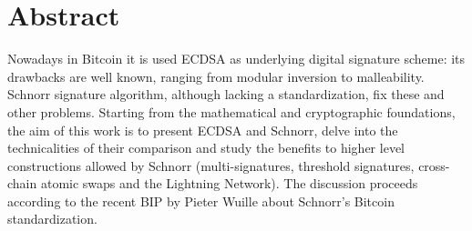\chapter{Abstract}
\label{chpr:abstract}
Nowadays in Bitcoin it is used ECDSA as underlying digital signature scheme: its drawbacks are well known, ranging from modular inversion to malleability. Schnorr signature algorithm, although lacking a standardization, fix these and other problems. Starting from the mathematical and cryptographic foundations, the aim of this work is to present ECDSA and Schnorr, delve into the technicalities of their comparison and study the benefits to higher level constructions allowed by Schnorr (multi-signatures, threshold signatures, cross-chain atomic swaps and the Lightning Network). The discussion proceeds according to the recent BIP by Pieter Wuille about Schnorr's Bitcoin standardization.